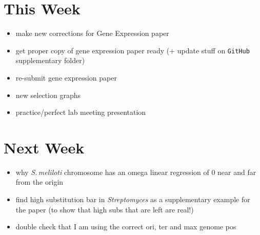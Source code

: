 \documentclass[12pt]{article}
\newcommand{\smel}{\textit{S.\,meliloti}\xspace}
\newcommand{\strep}{\textit{Streptomyces}\xspace}
\begin{document}

\section*{This Week}
%
\begin{itemize}
	\item make new corrections for Gene Expression paper
	\item get proper copy of gene expression paper ready (+ update stuff on \texttt{GitHub} supplementary folder)
	\item re-submit gene expression paper
	\item new selection graphs
	\item practice/perfect lab meeting presentation
\end{itemize}


\section*{Next Week}
\begin{itemize}
	\item why \smel chromosome has an omega linear regression of 0 near and far from the origin
	\item find high substitution bar in \strep as a supplementary example for the paper (to show that high subs that are left are real!)
	\item double check that I am using the correct ori, ter and max genome pos
\end{itemize}

\newpage



\end{document}

